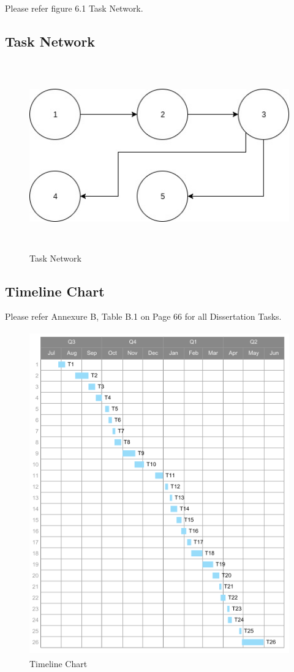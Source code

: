 \documentclass[oneside,a4paper,12pt]{pictreport}
\begin{document}
\par Please refer figure 6.1 Task Network.

\subsection{Task Network}
\begin{figure}[!h]
\centering
\includegraphics[width=5.5in,height=3.2in]{task.jpg}
\caption{Task Network}
\end{figure}
\newpage
\subsection{Timeline Chart}
Please refer Annexure B, Table B.1 on Page 66 for all Dissertation Tasks.
\begin{figure}[!h]
\centering
\includegraphics[width=5.5in,height=5.5in]{timeline.png}
\caption{Timeline Chart}
\end{figure}
\end{document}
